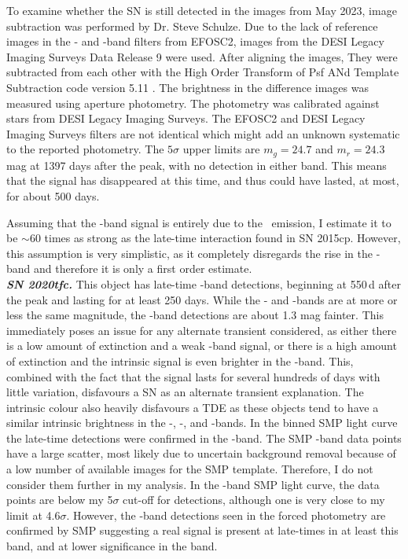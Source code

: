 \documentclass[a4paper,oneside,12pt, class=Latex/Classes/PhDthesisPSnPDF, crop=false]{standalone}
\begin{document}
To examine whether the SN is still detected in the images from May 2023, image subtraction was performed by Dr. Steve Schulze. Due to the lack of reference images in the \ztfg- and \ztfr-band filters from EFOSC2, images from the DESI Legacy Imaging Surveys Data Release 9 \citep{DESI-Legacy_Imaging_Surveys} were used. After aligning the images, They were subtracted from each other with the High Order Transform of Psf ANd Template Subtraction code version 5.11 \citep[\textsc{hotpants};][]{HOTPANTS}. The brightness in the difference images was measured using aperture photometry. The photometry was calibrated against stars from DESI Legacy Imaging Surveys. The EFOSC2 and DESI Legacy Imaging Surveys filters are not identical which might add an unknown systematic to the reported photometry. The $5\sigma$ upper limits are $m_g = 24.7$ and $m_r = 24.3$ mag at 1397 days after the peak, with no detection in either band. This means that the signal has disappeared at this time, and thus could have lasted, at most, for about 500 days.

Assuming that the \ztfr-band signal is entirely due to the \Halpha~emission, I estimate it to be $\sim$60 times as strong as the late-time interaction found in SN 2015cp. However, this assumption is very simplistic, as it completely disregards the rise in the \ztfi-band and therefore it is only a first order estimate.\\


\textit{\textbf{SN 2020tfc.}}
This object has late-time \ztfg\ztfr\ztfi-band detections, beginning at 550\,d after the peak and lasting for at least 250 days. While the \ztfr- and \ztfi-bands are at more or less the same magnitude, the \ztfg-band detections are about 1.3 mag fainter. This immediately poses an issue for any alternate transient considered, as either there is a low amount of extinction and a weak \ztfg-band signal, or there is a high amount of extinction and the intrinsic signal is even brighter in the \ztfi-band. This, combined with the fact that the signal lasts for several hundreds of days with little variation, disfavours a SN as an alternate transient explanation. The intrinsic colour also heavily disfavours a TDE as these objects tend to have a similar intrinsic brightness in the \ztfg-, \ztfr-, and \ztfi-bands. In the binned SMP light curve the late-time detections were confirmed in the \ztfg-band. The SMP \ztfi-band data points have a large scatter, most likely due to uncertain background removal because of a low number of available images for the SMP template. Therefore, I do not consider them further in my analysis. In the \ztfr-band SMP light curve, the data points are below my 5$\sigma$ cut-off for detections, although one is very close to my limit at 4.6$\sigma$. However, the \ztfg-band detections seen in the forced photometry are confirmed by SMP suggesting a real signal is present at late-times in at least this band, and at lower significance in the \ztfr band. 
\end{document}
